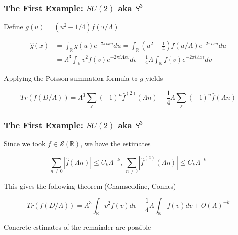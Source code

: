 \documentclass{beamer}
\def\Z{{\mathbb Z}}
\def\R{{\mathbb R}}
\def\cS{{\mathcal S}}
\begin{document}
\begin{frame}
	\frametitle{The First Example: $SU(2)$ aka $S^3$}
	\begin{block}{}
		Define $g(u) = (u^2 -1/4)f(u/\Lambda)$
	\end{block}

	\pause

	\begin{block}{}
		\begin{align*}
			\widehat{g}(x) &= \int_{\R}g(u) e^{-2 \pi i x u}du = \int_{\R}(u^2 - \frac{1}{4})f(u/\Lambda)e^{-2 \pi i x u}du \\
			&= \Lambda ^3 \int_{\R}v^2 f(v) e^{-2\pi i \Lambda x v}dv - \frac{1}{4} \Lambda \int_{\R}f(v)e^{-2\pi i \Lambda xv}dv
		\end{align*}
	\end{block}

	\pause

	\begin{block}{}
		Applying the Poisson summation formula to $g$ yields

		\[
			Tr(f(D/\Lambda)) = \Lambda^3 \sum_{\Z}(-1)^n \widehat{f}^{(2)}(\Lambda n) - \frac{1}{4} \Lambda \sum_{\Z}(-1)^n \widehat{f}(\Lambda n)
		\]
	\end{block}
\end{frame}

\begin{frame}
	\frametitle{The First Example: $SU(2)$ aka $S^3$}
	\begin{block}{}
		Since we took $f \in \cS (\R)$, we have the estimates

		\[
			\sum_{n \neq 0}|\widehat{f}(\Lambda n)| \leq C_k \Lambda^{-k}, ~ \sum_{n \neq 0}|\widehat{f}^{(2)}(\Lambda n)| \leq C_k \Lambda^{-k}
		\]
	\end{block}

	\pause

	\begin{block}{}
		This gives the following theorem (Chamseddine, Connes)

		\[
			Tr(f(D/\Lambda)) = \Lambda^3 \int_\R v^2 f(v) dv - \frac{1}{4}\Lambda \int_{\R}f(v)dv + O(\Lambda)^{-k}
		\]
	\end{block}

	\pause

	\begin{block}{}
		Concrete estimates of the remainder are possible
	\end{block}
\end{frame}
\end{document}
